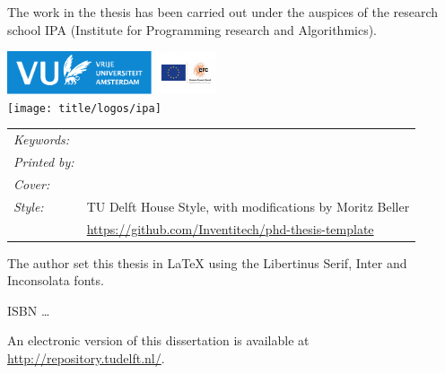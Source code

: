 \begin{titlepage}
\medskip
\medskip
\noindent The work in the thesis has been carried out under the auspices of the research school IPA
(Institute for Programming research and Algorithmics).

\medskip
\vfill
\begin{center}
    \includegraphics[height=0.5in]{title/logos/vulogo}
    \hspace{2em}
    \includegraphics[height=0.5in]{title/logos/erclogo}
    \\ \vspace{0.5cm}
    \texttt{[image: title/logos/ipa]}
\end{center}
\vfill

\noindent
\begin{tabular}{@{}p{}@{}p{}}
  \textit{Keywords:} &  \\[\medskipamount]
      \textit{Printed by:} &  \\[\medskipamount]
      \textit{Cover:} &  \\[\medskipamount]
      \textit{Style:} & TU Delft House Style, with modifications by Moritz Beller \\& \url{https://github.com/Inventitech/phd-thesis-template} \\[\medskipamount]
\end{tabular}

\medskip
\medskip
\noindent The author set this thesis in \LaTeX\xspace using the Libertinus Serif, Inter and Inconsolata fonts.

\vspace{\bigskipamount}



\noindent ISBN \ldots

\medskip
\noindent An electronic version of this dissertation is available at \\
\url{http://repository.tudelft.nl/}.

\end{titlepage}

